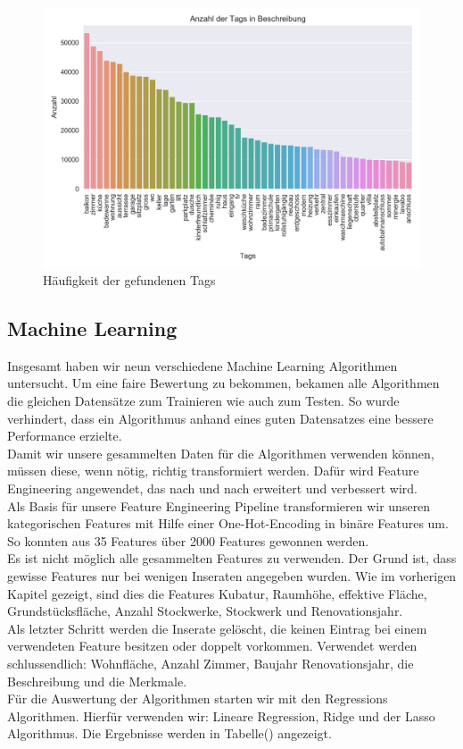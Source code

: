 \begin{figure}[ht]
\centering
\includegraphics[width=\textwidth]{images/tags.png}
\caption[Häufigkeit der gefundenen Tags]{Häufigkeit der gefundenen Tags}%
\label{fig:tags}
\end{figure}
\newline
%
\subsection{Machine Learning}
Insgesamt haben wir neun verschiedene Machine Learning Algorithmen untersucht. Um eine faire Bewertung zu bekommen, bekamen alle Algorithmen die gleichen Datensätze zum Trainieren wie auch zum Testen. So wurde verhindert, dass ein Algorithmus anhand eines guten Datensatzes eine bessere Performance erzielte.\\[2ex]
%
Damit wir unsere gesammelten Daten für die Algorithmen verwenden können, müssen diese, wenn nötig, richtig transformiert werden. Dafür wird Feature Engineering angewendet, das nach und nach erweitert und verbessert wird.\\[2ex]
%
Als Basis für unsere Feature Engineering Pipeline transformieren wir unseren kategorischen Features mit Hilfe einer One-Hot-Encoding in binäre Features um. So konnten aus 35 Features über 2000 Features gewonnen werden.\\
Es ist nicht möglich alle gesammelten Features zu verwenden. Der Grund ist, dass gewisse Features nur bei wenigen Inseraten angegeben wurden. Wie im vorherigen Kapitel gezeigt, sind dies die Features Kubatur, Raumhöhe, effektive Fläche, Grundstücksfläche, Anzahl Stockwerke, Stockwerk und Renovationsjahr.\\
Als letzter Schritt werden die Inserate gelöscht, die keinen Eintrag bei einem verwendeten Feature besitzen oder doppelt vorkommen. Verwendet werden schlussendlich: Wohnfläche, Anzahl Zimmer, Baujahr Renovationsjahr, die Beschreibung und die Merkmale.\\[2ex]

Für die Auswertung der Algorithmen starten wir mit den Regressions Algorithmen. Hierfür verwenden wir: Lineare Regression, Ridge und der Lasso Algorithmus. Die Ergebnisse werden in Tabelle() angezeigt.


